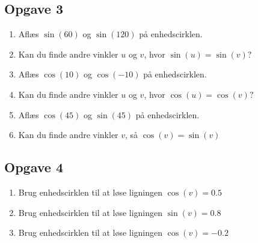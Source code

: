 


\subsection*{Opgave 3}

\begin{enumerate}[label=\roman*)]
	\item Aflæs $\sin(60)$ og $\sin(120)$ på enhedscirklen. 
	\item Kan du finde andre vinkler $u$ og $v$, hvor 
	$\sin(u)=\sin(v)?$
	\item Aflæs $\cos(10)$ og $\cos(-10)$ på enhedscirklen.
	\item Kan du finde andre vinkler $u$ og $v$, hvor 
	$\cos(u)=\cos(v)?$
	\item Aflæs $\cos(45)$ og $\sin(45)$ på enhedscirklen. 
	\item Kan du finde andre vinkler $v$, så $\cos(v)=\sin(v)$
\end{enumerate}

\subsection*{Opgave 4}
\begin{enumerate}[label=\roman*)]
	\item Brug enhedscirklen til at løse ligningen $\cos(v) = 0.5$
	\item Brug enhedscirklen til at løse ligningen $\sin(v) = 0.8$
	\item Brug enhedscirklen til at løse ligningen $\cos(v) = -0.2$
\end{enumerate}

